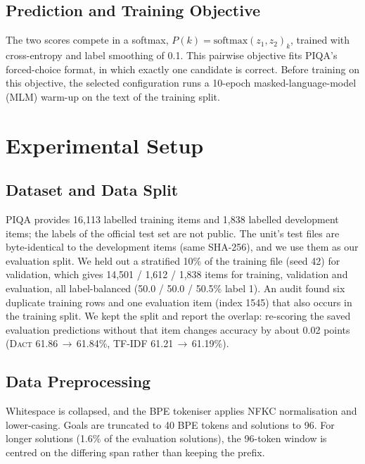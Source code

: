 \documentclass[11pt]{article}
\newcommand{\dact}{\textsc{Dact}}
\begin{document}
\subsection{Prediction and Training Objective}
The two scores compete in a softmax, $P(k) = \mathrm{softmax}(z_1, z_2)_k$, trained with cross-entropy and label smoothing of 0.1. This pairwise objective fits PIQA's forced-choice format, in which exactly one candidate is correct. Before training on this objective, the selected configuration runs a 10-epoch masked-language-model (MLM) warm-up \cite{devlin2019bert} on the text of the training split.


\section{Experimental Setup}

\subsection{Dataset and Data Split}
PIQA provides 16{,}113 labelled training items and 1{,}838 labelled development items; the labels of the official test set are not public. The unit's test files are byte-identical to the development items (same SHA-256), and we use them as our evaluation split. We held out a stratified 10\% of the training file (seed 42) for validation, which gives 14{,}501 / 1{,}612 / 1{,}838 items for training, validation and evaluation, all label-balanced (50.0 / 50.0 / 50.5\% label 1). An audit found six duplicate training rows and one evaluation item (index 1545) that also occurs in the training split. We kept the split and report the overlap: re-scoring the saved evaluation predictions without that item changes accuracy by about 0.02 points (\dact{} 61.86\,$\to$\,61.84\%, TF-IDF 61.21\,$\to$\,61.19\%).

\subsection{Data Preprocessing}
Whitespace is collapsed, and the BPE tokeniser applies NFKC normalisation and lower-casing. Goals are truncated to 40 BPE tokens and solutions to 96. For longer solutions (1.6\% of the evaluation solutions), the 96-token window is centred on the differing span rather than keeping the prefix.
\end{document}
